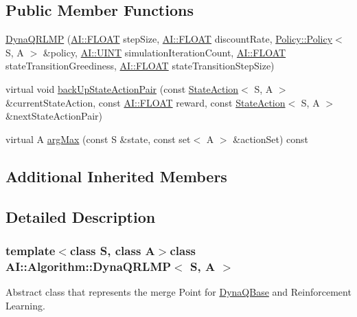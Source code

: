 \subsection*{Public Member Functions}
\begin{DoxyCompactItemize}
\item 
\hyperlink{classAI_1_1Algorithm_1_1DynaQRLMP_a79f36f74cf9de4649b07df5d46282598}{Dyna\-Q\-R\-L\-M\-P} (\hyperlink{namespaceAI_a41b74884a20833db653dded3918e05c3}{A\-I\-::\-F\-L\-O\-A\-T} step\-Size, \hyperlink{namespaceAI_a41b74884a20833db653dded3918e05c3}{A\-I\-::\-F\-L\-O\-A\-T} discount\-Rate, \hyperlink{classAI_1_1Algorithm_1_1Policy_1_1Policy}{Policy\-::\-Policy}$<$ S, A $>$ \&policy, \hyperlink{namespaceAI_ab6e14dc1e659854858a87e511f1439ec}{A\-I\-::\-U\-I\-N\-T} simulation\-Iteration\-Count, \hyperlink{namespaceAI_a41b74884a20833db653dded3918e05c3}{A\-I\-::\-F\-L\-O\-A\-T} state\-Transition\-Greediness, \hyperlink{namespaceAI_a41b74884a20833db653dded3918e05c3}{A\-I\-::\-F\-L\-O\-A\-T} state\-Transition\-Step\-Size)
\item 
virtual void \hyperlink{classAI_1_1Algorithm_1_1DynaQRLMP_a7b3b5f3706744290b12c19f786e5e4e4}{back\-Up\-State\-Action\-Pair} (const \hyperlink{classAI_1_1StateAction}{State\-Action}$<$ S, A $>$ \&current\-State\-Action, const \hyperlink{namespaceAI_a41b74884a20833db653dded3918e05c3}{A\-I\-::\-F\-L\-O\-A\-T} reward, const \hyperlink{classAI_1_1StateAction}{State\-Action}$<$ S, A $>$ \&next\-State\-Action\-Pair)
\item 
virtual A \hyperlink{classAI_1_1Algorithm_1_1DynaQRLMP_a57a8d01392c4a3699853f3aa623d9ebf}{arg\-Max} (const S \&state, const set$<$ A $>$ \&action\-Set) const 
\end{DoxyCompactItemize}
\subsection*{Additional Inherited Members}


\subsection{Detailed Description}
\subsubsection*{template$<$class S, class A$>$class A\-I\-::\-Algorithm\-::\-Dyna\-Q\-R\-L\-M\-P$<$ S, A $>$}

Abstract class that represents the merge Point for \hyperlink{classAI_1_1Algorithm_1_1DynaQBase}{Dyna\-Q\-Base} and Reinforcement Learning. 


